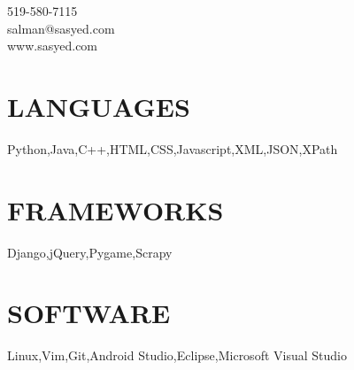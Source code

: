 \documentclass[margin,line]{resume}
\begin{document}
{
    \sc
    \hfill 519-580-7115                  \vspace{0mm}\\\vspace{0mm}%
    \hfill salman@sasyed.com            \vspace{0mm}\\\vspace{0mm}%
    \hfill www.sasyed.com             \vspace{0mm}\\\vspace{-10mm}%
}

\begin{resume}

\vspace{1mm}

    \section{\mysidestyle \textbf{\large{L}\small{ANGUAGES}}}
    Python,\hspace{2mm}Java,\hspace{2mm}C++,\hspace{2mm}HTML,\hspace{2mm}CSS,\hspace{2mm}Javascript,\hspace{2mm}XML,\hspace{2mm}JSON,\hspace{2mm}XPath

\sectionline\vspace{1mm}

    \section{\mysidestyle \textbf{\large{F}\small{RAMEWORKS}}}
    Django,\hspace{2mm}jQuery,\hspace{2mm}Pygame,\hspace{2mm}Scrapy

\sectionline\vspace{1mm}

    \section{\mysidestyle \textbf{\large{S}\small{OFTWARE}}}
    Linux,\hspace{2mm}Vim,\hspace{2mm}Git,\hspace{2mm}Android Studio,\hspace{2mm}Eclipse,\hspace{2mm}Microsoft Visual Studio


\end{resume}
\end{document}

